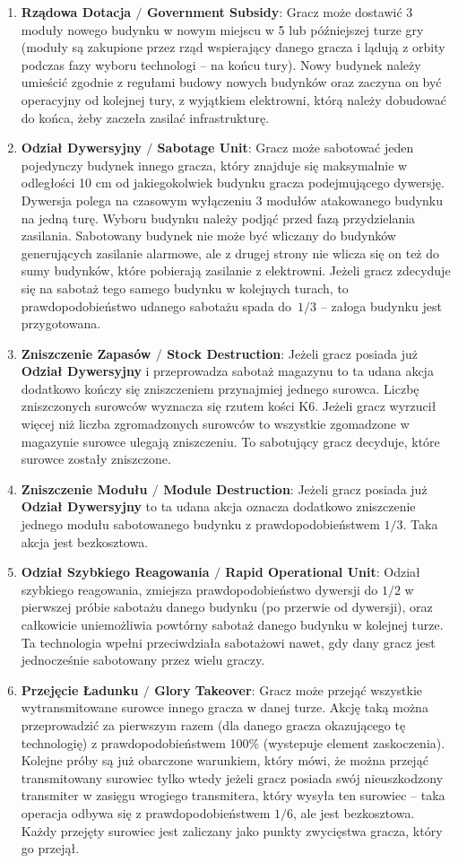 \documentclass[11pt,a4paper]{article}
\begin{document}
\begin{enumerate}
\item \textbf{Rządowa Dotacja $/$ Government Subsidy}: Gracz może dostawić 3 moduły nowego budynku w nowym miejscu w 5 lub późniejszej turze gry (moduły są zakupione przez rząd wspierający danego gracza i lądują z orbity podczas fazy wyboru technologi -- na końcu tury). Nowy budynek należy umieścić zgodnie z regułami budowy nowych budynków oraz zaczyna on być operacyjny od kolejnej tury, z wyjątkiem elektrowni, którą należy dobudować do końca, żeby zaczeła zasilać infrastrukturę.
\item \textbf{Odział Dywersyjny $/$ Sabotage Unit}: Gracz może sabotować jeden pojedynczy budynek innego gracza, który znajduje się maksymalnie w odległości 10 cm od jakiegokolwiek budynku gracza podejmującego dywersję. Dywersja polega na czasowym wyłączeniu 3 modułów atakowanego budynku na jedną turę. Wyboru budynku należy podjąć przed fazą przydzielania zasilania. Sabotowany budynek nie może być wliczany do budynków generujących zasilanie alarmowe, ale z drugej strony nie wlicza się on też do sumy budynków, które pobierają zasilanie z elektrowni. Jeżeli gracz zdecyduje się na sabotaż tego samego budynku w kolejnych turach, to prawdopodobieństwo udanego sabotażu spada do~$1/3$ -- załoga budynku jest przygotowana.
\item \textbf{Zniszczenie Zapasów $/$ Stock Destruction}: Jeżeli gracz posiada już \textbf{Odział Dywersyjny} i przeprowadza sabotaż magazynu to ta udana akcja dodatkowo kończy się zniszczeniem przynajmiej jednego surowca. Liczbę zniszczonych surowców wyznacza się rzutem kości K6. Jeżeli gracz wyrzucił więcej niż liczba zgromadzonych surowców to wszystkie zgomadzone w magazynie surowce ulegają zniszczeniu. To sabotujący gracz decyduje, które surowce zostały zniszczone.  
\item \textbf{Zniszczenie Modułu $/$ Module Destruction}: Jeżeli gracz posiada już \textbf{Odział Dywersyjny} to ta udana akcja oznacza dodatkowo zniszczenie jednego modułu sabotowanego budynku z prawdopodobieństwem $1/3$. Taka akcja jest bezkosztowa.
\item \textbf{Odział Szybkiego Reagowania $/$ Rapid Operational Unit}: Odział szybkiego reagowania, zmiejsza prawdopodobieństwo dywersji do $1/2$ w pierwszej próbie sabotażu danego budynku (po przerwie od dywersji), oraz całkowicie uniemożliwia powtórny sabotaż danego budynku w kolejnej turze. Ta technologia wpełni przeciwdziała sabotażowi nawet, gdy dany gracz jest jednocześnie sabotowany przez wielu graczy.  
\item \textbf{Przejęcie Ładunku $/$ Glory Takeover}: Gracz może przejąć wszystkie wytransmitowane surowce innego gracza w danej turze. Akcję taką można przeprowadzić za pierwszym razem (dla danego gracza okazującego tę technologię) z prawdopodobieństwem 100\% (wystepuje element zaskoczenia). Kolejne próby są już obarczone warunkiem, który mówi, że można przejąć transmitowany surowiec tylko wtedy jeżeli gracz posiada swój nieuszkodzony transmiter w zasięgu wrogiego transmitera, który wysyła ten surowiec -- taka operacja odbywa się z prawdopodobieństwem $1/6$, ale jest bezkosztowa. Każdy przejęty surowiec jest zaliczany jako punkty zwycięstwa gracza, który go przejął. 
\end{enumerate}
\end{document}
